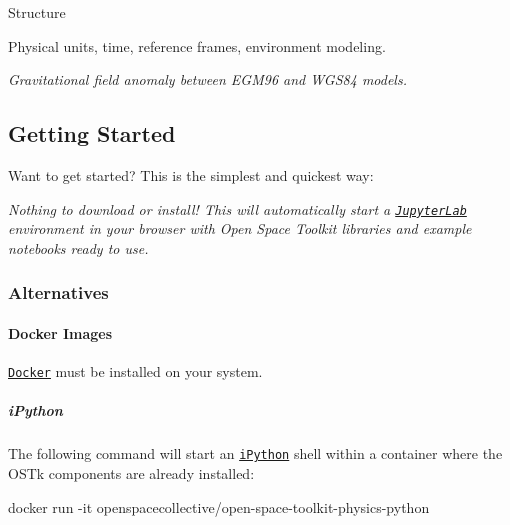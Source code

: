 Structure

\href{https://travis-ci.com/open-space-collective/open-space-toolkit-physics}{\tt } \href{https://codecov.io/gh/open-space-collective/open-space-toolkit-physics}{\tt } \href{https://open-space-collective.github.io/open-space-toolkit-physics}{\tt } \href{https://badge.fury.io/gh/open-space-collective%2Fopen-space-toolkit-physics}{\tt } \href{https://badge.fury.io/py/open-space-toolkit-physics}{\tt } \href{https://opensource.org/licenses/Apache-2.0}{\tt }

Physical units, time, reference frames, environment modeling.



{\itshape Gravitational field anomaly between E\+G\+M96 and W\+G\+S84 models.}

\subsection*{Getting Started}

Want to get started? This is the simplest and quickest way\+:

\href{https://mybinder.org/v2/gh/open-space-collective/open-space-toolkit/master?urlpath=lab/tree/notebooks}{\tt }

{\itshape Nothing to download or install! This will automatically start a \href{https://jupyterlab.readthedocs.io/en/stable/}{\tt Jupyter\+Lab} environment in your browser with Open Space Toolkit libraries and example notebooks ready to use.}

\subsubsection*{Alternatives}

\paragraph*{Docker Images}

\href{https://www.docker.com/}{\tt Docker} must be installed on your system.

\subparagraph*{i\+Python}

The following command will start an \href{https://ipython.org/}{\tt i\+Python} shell within a container where the O\+S\+Tk components are already installed\+:


\begin{DoxyCode}
docker run -it openspacecollective/open-space-toolkit-physics-python
\end{DoxyCode}


